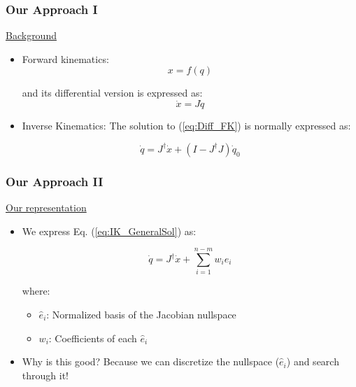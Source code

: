 \documentclass[10pt]{beamer}
\newcommand{\J}{\ensuremath{J}}
\newcommand{\Jps}{\ensuremath{J^{\dagger}}}
\newcommand{\dx}{\ensuremath{\dot{x}}}
\newcommand{\dq}{\ensuremath{\dot{q}}}
\newcommand{\q}{\ensuremath{q}}
\newcommand{\nsb}{\ensuremath{\hat{e}}} %
\newcommand{\nsc}{\ensuremath{w}}  %
\begin{document}
\begin{frame}
\frametitle{Our Approach I}
\begin{center}
	\begin{normalsize}
		{\color{blue} \underline{Background} }
	\end{normalsize}
\end{center}
\begin{itemize}
\item{ {\color{blue}Forward kinematics:}
	\begin{equation}
		x = f(\q)
		\label{eq:FK}
	\end{equation}
	
and its differential version is expressed as:
	\begin{equation}
		\dot{x} = \J \dq
		\label{eq:Diff_FK}
	\end{equation}	}
\item{ {\color{blue}Inverse Kinematics:}
The solution to (\ref{eq:Diff_FK}) is normally expressed as:

	\begin{equation}
		\dq = \Jps \dx + (I - \Jps \J)\dq_{0}
		\label{eq:IK_GeneralSol}
	\end{equation} }
\end{itemize}

\end{frame}

\begin{frame}
\frametitle{Our Approach II}

\begin{center}
	\begin{normalsize}
		{\color{blue} \underline{Our representation}}
	\end{normalsize}
\end{center}

\begin{itemize}
\item{ We express Eq. (\ref{eq:IK_GeneralSol}) as:

	\begin{equation}
		\dq = \Jps \dx + \displaystyle \sum_{i=1}^{n-m} \nsc_{i}\nsb_{i}
		\label{eq:Proposed_Eq1}
	\end{equation}

	where:
	\begin{itemize}
		\item{ $\nsb_{i}$: Normalized basis of the Jacobian nullspace}
		\item{$\nsc_{i}$: Coefficients of each $\nsb_{i}$}
	\end{itemize} }
\item{Why is this good? Because we can discretize the nullspace ($\nsb_{i}$) and search through it!}
\end{itemize}
\end{frame}
\end{document}
